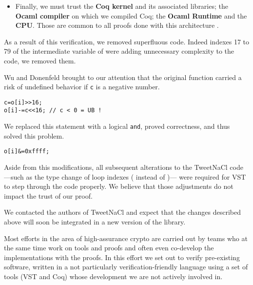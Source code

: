 \begin{itemize}
  \item Finally, we must trust the \textbf{Coq kernel} and its
        associated libraries; the \textbf{Ocaml compiler} on which we compiled Coq;
        the \textbf{Ocaml Runtime} and the \textbf{CPU}. Those are common to all proofs
        done with this architecture \cite{2015-Appel,coq-faq}.
\end{itemize}

As a result of this verification, we removed superfluous code.
Indeed indexes 17 to 79 of the  intermediate variable of
 were adding unnecessary complexity to the code,
we removed them.

Wu and Donenfeld brought to our attention that the original
 function carried a risk of undefined behavior if \texttt{c}
is a negative number.
\begin{lstlisting}[language=Ctweetnacl,stepnumber=0]
c=o[i]>>16;
o[i]-=c<<16; // c < 0 = UB !
\end{lstlisting}
We replaced this statement with a logical \texttt{and}, proved correctness,
and thus solved this problem.
\begin{lstlisting}[language=Ctweetnacl,stepnumber=0]
o[i]&=0xffff;
\end{lstlisting}

Aside from this modifications, all subsequent alterations to the TweetNaCl code%
---such as the type change of loop indexes ( instead of )---%
were required for VST to step through the code properly. We believe that those
adjustments do not impact the trust of our proof.

We contacted the authors of TweetNaCl and expect that the changes described
above will soon be integrated in a new version of the library.




Most efforts in the area of high-assurance crypto are carried out
by teams who at the same time work on tools and proofs and often
even co-develop the implementations with the proofs.
In this effort we set out to verify pre-existing software,
written in a not particularly verification-friendly language
using a set of tools (VST and Coq) whose development we are not
actively involved in.

